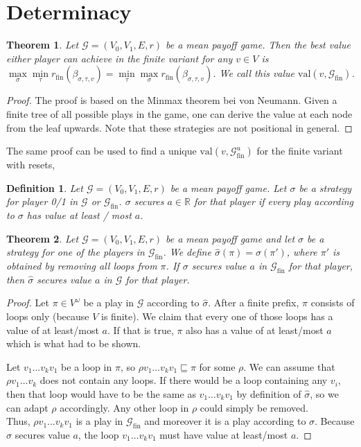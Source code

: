 \documentclass{article}
\newtheorem{theorem}{Theorem}
\newtheorem{definition}{Definition}
\begin{document}
\section{Determinacy}
\begin{theorem}
	Let $\mathcal{G} = (V_0, V_1, E, r)$ be a mean payoff game. Then the best value either player can achieve in the finite variant for any $v \in V$ is $\max\limits_\sigma \min\limits_\tau r_\text{fin}(\beta_{\sigma,\tau,v}) = \min\limits_\tau \max\limits_\sigma r_\text{fin}(\beta_{\sigma,\tau,v})$. We call this value $\text{val}(v, \mathcal{G}_\text{fin})$. 
\end{theorem}
\begin{proof}
	The proof is based on the Minmax theorem bei von Neumann. Given a finite tree of all possible plays in the game, one can derive the value at each node from the leaf upwards. Note that these strategies are not positional in general.
\end{proof}

The same proof can be used to find a unique $\text{val}(v, \mathcal{G}^u_\text{fin})$ for the finite variant with resets,

\begin{definition}
	Let $\mathcal{G} = (V_0, V_1, E, r)$ be a mean payoff game. Let $\sigma$ be a strategy for player 0/1 in $\mathcal{G}$ or $\mathcal{G}_\text{fin}$. $\sigma$ secures $a \in \mathbb{R}$ for that player if every play according to $\sigma$ has value at least / most $a$.
\end{definition}

\begin{theorem}
\label{thm:sec_carry}
	Let $\mathcal{G} = (V_0, V_1, E, r)$ be a mean payoff game and let $\sigma$ be a strategy for one of the players in $\mathcal{G}_\text{fin}$. We define $\hat{\sigma}(\pi) = \sigma(\pi')$, where $\pi'$ is obtained by removing all loops from $\pi$. If $\sigma$ secures value $a$ in $\mathcal{G}_\text{fin}$ for that player, then $\hat{\sigma}$ secures value $a$ in $\mathcal{G}$ for that player.
\end{theorem}
\begin{proof}
	Let $\pi \in V^\omega$ be a play in $\mathcal{G}$ according to $\hat{\sigma}$. After a finite prefix, $\pi$ consists of loops only (because $V$ is finite). We claim that every one of those loops has a value of at least/most $a$. If that is true, $\pi$ also has a value of at least/most $a$ which is what had to be shown.
	
	Let $v_1 \dots v_k v_1$ be a loop in $\pi$, so $\rho v_1 \dots v_k v_1 \sqsubseteq \pi$ for some $\rho$. We can assume that $\rho v_1 \dots v_k$ does not contain any loops. If there would be a loop containing any $v_i$, then that loop would have to be the same as $v_1 \dots v_k v_1$ by definition of $\hat{\sigma}$, so we can adapt $\rho$ accordingly. Any other loop in $\rho$ could simply be removed. \\
	Thus, $\rho v_1 \dots v_k v_1$ is a play in $\mathcal{G}_\text{fin}$ and moreover it is a play according to $\sigma$. Because $\sigma$ secures value $a$, the loop $v_1 \dots v_k v_1$ must have value at least/most $a$.
\end{proof}
\end{document}
